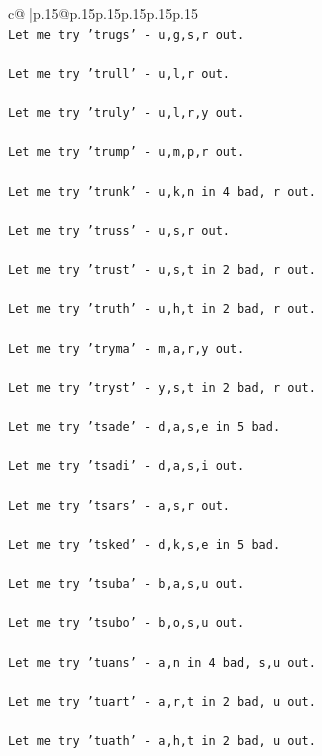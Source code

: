 \documentclass{article}
\begin{document}
{\begin{supertabular}{c@{$\;$}|p{.15\linewidth}@{}p{.15\linewidth}p{.15\linewidth}p{.15\linewidth}p{.15\linewidth}p{.15\linewidth}}
{{{\\ 
\texttt{Let me try 'trugs' {-} u,g,s,r out. } \\
\\ 
\texttt{Let me try 'trull' {-} u,l,r out. } \\
\\ 
\texttt{Let me try 'truly' {-} u,l,r,y out. } \\
\\ 
\texttt{Let me try 'trump' {-} u,m,p,r out. } \\
\\ 
\texttt{Let me try 'trunk' {-} u,k,n in 4 bad, r out. } \\
\\ 
\texttt{Let me try 'truss' {-} u,s,r out. } \\
\\ 
\texttt{Let me try 'trust' {-} u,s,t in 2 bad, r out. } \\
\\ 
\texttt{Let me try 'truth' {-} u,h,t in 2 bad, r out. } \\
\\ 
\texttt{Let me try 'tryma' {-} m,a,r,y out. } \\
\\ 
\texttt{Let me try 'tryst' {-} y,s,t in 2 bad, r out. } \\
\\ 
\texttt{Let me try 'tsade' {-} d,a,s,e in 5 bad. } \\
\\ 
\texttt{Let me try 'tsadi' {-} d,a,s,i out. } \\
\\ 
\texttt{Let me try 'tsars' {-} a,s,r out. } \\
\\ 
\texttt{Let me try 'tsked' {-} d,k,s,e in 5 bad. } \\
\\ 
\texttt{Let me try 'tsuba' {-} b,a,s,u out. } \\
\\ 
\texttt{Let me try 'tsubo' {-} b,o,s,u out. } \\
\\ 
\texttt{Let me try 'tuans' {-} a,n in 4 bad, s,u out. } \\
\\ 
\texttt{Let me try 'tuart' {-} a,r,t in 2 bad, u out. } \\
\\ 
\texttt{Let me try 'tuath' {-} a,h,t in 2 bad, u out. } \\
}}}
\end{supertabular}}
\end{document}
